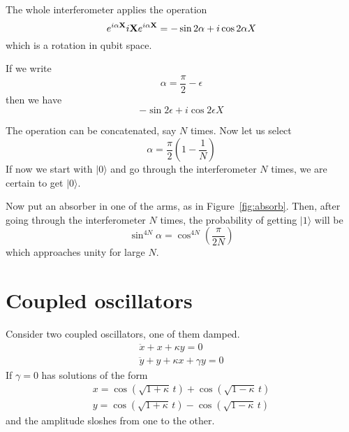 \documentclass[12pt,aps,prb,preprint]{revtex4}
\def\ket#1{|#1\rangle}
\def\X{{\bf X}}
\begin{document}
The whole interferometer applies the operation
\begin{equation}
e^{i\alpha\X} i\X e^{i\alpha\X} = -\sin2\alpha + i\cos2\alpha X
\end{equation}
which is a rotation in qubit space.

If we write
\begin{equation}
\alpha = \frac\pi2 - \epsilon
\end{equation}
then we have
\begin{equation}
-\sin2\epsilon + i\cos2\epsilon X
\end{equation}


The operation can be concatenated, say $N$ times.  Now let us select
\begin{equation}
\alpha = \frac\pi2 \left(1-\frac1N\right)
\end{equation}
If now we start with $\ket0$ and go through the interferometer $N$
times, we are certain to get $\ket0$.

Now put an absorber in one of the arms, as in Figure~\ref{fig:absorb}.
Then, after going through the interferometer $N$ times, the
probability of getting $\ket1$ will be
\begin{equation}
\sin^{4N}\alpha = \cos^{4N} \left(\frac\pi{2N}\right)
\end{equation}
which approaches unity for large $N$.

\section{Coupled oscillators}

Consider two coupled oscillators, one of them damped.
\begin{equation}
\begin{array}{l}
\ddot x + x + \kappa y = 0 \\
\ddot y + y + \kappa x + \gamma y = 0
\end{array}
\end{equation}
If $\gamma=0$ has solutions of the form
\begin{equation}
\begin{array}{l}
x = \cos(\sqrt{1+\kappa}\,t) + \cos(\sqrt{1-\kappa}\,t)  \\
y = \cos(\sqrt{1+\kappa}\,t) - \cos(\sqrt{1-\kappa}\,t)
\end{array}
\end{equation}
and the amplitude sloshes from one to the other.
\end{document}
